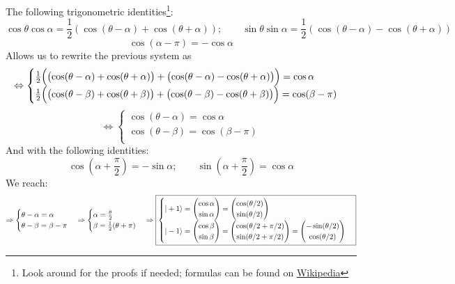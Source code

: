 \documentclass[solutions.tex]{subfiles}
\begin{document}
The following trigonometric identities\footnote{Look around
for the proofs if needed; formulas can be found on
\href{https://en.wikipedia.org/wiki/List\_of\_trigonometric\_identities\#Angle\_sum\_and\_difference\_identities}{Wikipedia}}:
\[
	\cos\theta\cos\alpha = \frac12(\cos(\theta-\alpha) + \cos(\theta+\alpha));\qquad
	\sin\theta\sin\alpha = \frac12(\cos(\theta-\alpha) - \cos(\theta+\alpha))
\]
\[
	\cos(\alpha-\pi) = -\cos\alpha
\]
Allows us to rewrite the previous system as
\[
	\Leftrightarrow\begin{cases}
		\frac12\Bigl(
			\bigl(\cos(\theta-\alpha)+\cos(\theta+\alpha)\bigr) +
			\bigl(\cos(\theta-\alpha)-\cos(\theta+\alpha)\bigr)
		\Bigr) = \cos\alpha \\
				\frac12\Bigl(
			\bigl(\cos(\theta-\beta)+\cos(\theta+\beta)\bigr) +
			\bigl(\cos(\theta-\beta)-\cos(\theta+\beta)\bigr)
		\Bigr) = \cos(\beta-\pi) \\
	\end{cases}
\]
\[
	\Leftrightarrow\begin{cases}
		\cos(\theta-\alpha) = \cos\alpha \\
		\cos(\theta-\beta)  = \cos(\beta-\pi) \\
	\end{cases}
\]
And with the following identities:
\[
	\cos(\alpha+\frac\pi2) = -\sin\alpha;\qquad
	\sin(\alpha+\frac\pi2) = \cos\alpha
\]
We reach:
\[
	\Rightarrow\begin{cases}
		\theta-\alpha = \alpha \\
		\theta-\beta = \beta-\pi \\
	\end{cases}\Rightarrow\begin{cases}
		\alpha = \frac\theta2 \\
		\beta  = \frac12(\theta+\pi) \\
	\end{cases}\Rightarrow\boxed{\begin{cases}
		|+1\rangle = \begin{pmatrix}
			\cos\alpha \\
			\sin\alpha \\
		\end{pmatrix} = \begin{pmatrix}
			\cos(\theta/2) \\
			\sin(\theta/2) \\
		\end{pmatrix} \\
		|-1\rangle = \begin{pmatrix}
			\cos\beta \\
			\sin\beta \\
		\end{pmatrix} = \begin{pmatrix}
			\cos(\theta/2 + \pi/2) \\
			\sin(\theta/2 + \pi/2) \\
		\end{pmatrix} = \begin{pmatrix}
			-\sin(\theta/2) \\
			\cos(\theta/2) \\
		\end{pmatrix}\\
	\end{cases}}
\]
\end{document}
